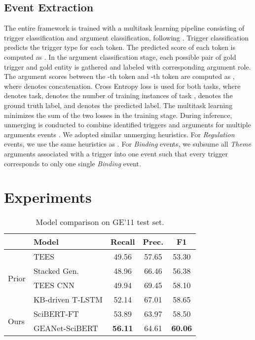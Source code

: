 \documentclass[11pt,a4paper]{article}
\newcommand{\GAENet}{\textrm{GEANet}}
\newcommand{\GE}{\textrm{{\fontfamily{qcr}\selectfont GE'11} }}
\begin{document}
\subsection{Event Extraction}
The entire framework is trained with a multitask learning pipeline consisting of trigger classification and argument classification, following \cite{han2019deep,han-etal-2019-joint}. Trigger classification predicts the trigger type for each token. The predicted score of each token is computed as . In the argument classification stage, each possible pair of gold trigger and gold entity is gathered and labeled with corresponding argument role.\footnotemark{} The argument scores between the -th token and -th token are computed as , where  denotes concatenation. Cross Entropy loss   is used for both tasks, where  denotes task,  denotes the number of training instances of task ,  denotes the ground truth label, and  denotes the predicted label. The multitask learning minimizes the sum of the two losses  in the training stage. During inference, unmerging is conducted to combine identified triggers and arguments for multiple arguments events \cite{bjorne-salakoski-2011-generalizing}. We adopted similar unmerging heuristics. For \textit{Regulation} events, we use the same heuristics as . For \textit{Binding} events, we subsume all \textit{Theme} arguments associated with a trigger into one event such that every trigger corresponds to only one single \textit{Binding} event. 









 \section{Experiments}

\begin{table}[t]
\small
\centering
\begin{tabular}{llccc}
\hline & \textbf{Model}  & \textbf{Recall}  & \textbf{Prec.}  & \textbf{F1} \\ \hline
\multirow{4}{*}{Prior} & TEES & 49.56 & 57.65 & 53.30 \\
& Stacked Gen. & 48.96 &  66.46 & 56.38 \\
& TEES CNN & 49.94 & 69.45 & 58.10        \\
& KB-driven T-LSTM & 52.14 & 67.01 & 58.65 \\
\hline
\hline
\multirow{2}{*}{Ours} & SciBERT-FT & 53.89 & 63.97 & 58.50 \\
& \GAENet-SciBERT & \textbf{56.11}  &  64.61 &  \textbf{60.06} \\
\hline
\end{tabular}
\caption{\label{font-table} Model comparison on \GE test set.}
\label{overall_comparison}
\end{table}
\end{document}
